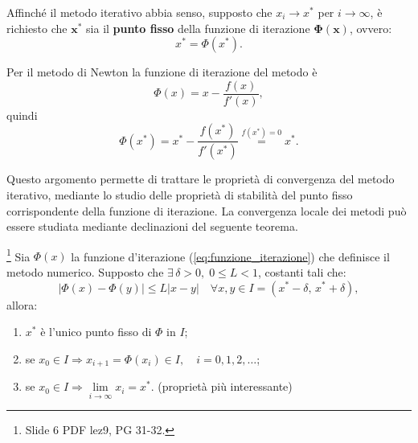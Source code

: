 Affinché il metodo iterativo abbia senso, supposto che $x_i\rightarrow x^*$ per $i\rightarrow\infty$, è richiesto che $\boldsymbol{x^*}$ sia il \textbf{punto fisso} della funzione di iterazione $\boldsymbol{\Phi(x)}$, ovvero:
\begin{equation*}
	x^*=\Phi (x^*).
\end{equation*}

\begin{definition}
	Per il metodo di Newton la funzione di iterazione del metodo è
	\begin{equation}\label{eq:funzione_iterazione_newton}
		\Phi (x)=x-\frac{f(x)}{f'(x)},
	\end{equation}
	quindi
	\begin{equation*}
		\Phi (x^*)=x^*-\frac{f(x^*)}{f'(x^*)}\overset{f(x^*)=0}{=}x^*.
	\end{equation*}
\end{definition}

Questo argomento permette di trattare le proprietà di convergenza del metodo iterativo, mediante lo studio delle proprietà di stabilità del punto fisso corrispondente della funzione di iterazione. La convergenza locale dei metodi può essere studiata mediante declinazioni del seguente teorema.

\begin{theorem}\label{th:punto_fisso}
	\footnote{Slide 6 PDF lez9, PG 31-32.}
	Sia $\Phi(x)$ la funzione d'iterazione (\ref{eq:funzione_iterazione}) che definisce il \gls{metodo numerico}. Supposto che $\exists\,\delta >0,\; 0\leq L<1$, costanti tali che:
	\begin{equation*}
		|\Phi (x)-\Phi (y)|\leq L|x-y| \quad\forall x,y \in I=(x^*-\delta,\, x^*+\delta),
	\end{equation*}
	allora:
	\begin{enumerate}
		\item $x^*$ è l'unico punto fisso di $\Phi$ in $I$;
		\item se $x_0 \in I\Rightarrow x_{i+1} = \Phi(x_i)\in I,\quad i=0,1,2,\hdots$;
		\item se $x_0\in I \Rightarrow \underset{{i\to\infty}}{\lim}{x_i}=x^*$. (proprietà più interessante)
	\end{enumerate}
\end{theorem}

